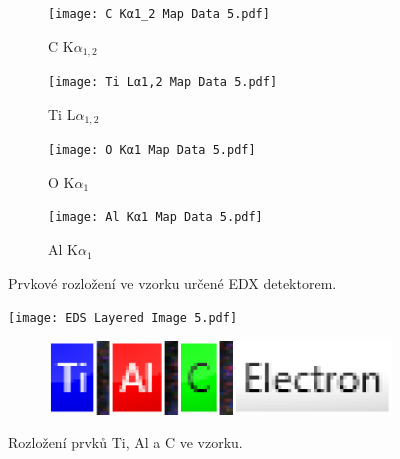 \documentclass[a4paper,12pt]{article}
\begin{document}
\begin{figure}[h!]
	\centering
	\begin{subfigure}{0.49\textwidth}
		\texttt{[image: C Kα1\_2 Map Data 5.pdf]}
		\caption{\centering C K$\alpha_{1,2}$}
		\label{fig:EDX_C}
	\end{subfigure}
	\begin{subfigure}{0.49\textwidth}
		\texttt{[image: Ti Lα1,2 Map Data 5.pdf]}
		\caption{\centering Ti L$\alpha_{1,2}$}
		\label{fig:EDX_Ti}
	\end{subfigure}
	\begin{subfigure}{0.49\textwidth}
		\texttt{[image: O Kα1 Map Data 5.pdf]}
		\caption{\centering O K$\alpha_{1}$}
		\label{fig:EDX_O}
	\end{subfigure}
	\begin{subfigure}{0.49\textwidth}
		\texttt{[image: Al Kα1 Map Data 5.pdf]}
		\caption{\centering Al K$\alpha_{1}$}
		\label{fig:EDX_Al}
	\end{subfigure}
	
	\caption{Prvkové rozložení ve vzorku určené EDX detektorem.}
	\label{fig:EDX}
\end{figure}

\begin{figure}[h!]
	\centering
	\texttt{[image: EDS Layered Image 5.pdf]}

	\begin{subfigure}{0.2\textwidth}
		\vspace*{-60mm}
		\hspace*{65mm}
		\includegraphics[width=\textwidth]{legend.png}
	\end{subfigure}
	\caption{\centering Rozložení prvků Ti, Al a C ve vzorku.}
	\label{fig:EDX_tot}
\end{figure}
\end{document}
